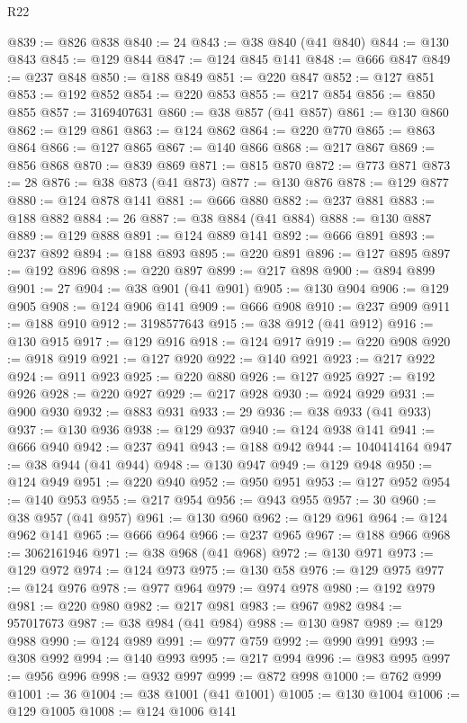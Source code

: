 \begin{lexlean}{R22}
\begin{coremodule}
@839 := @826 @838
@840 := 24
@843 := @38 @840 (@41 @840)
@844 := @130 @843
@845 := @129 @844
@847 := @124 @845 @141
@848 := @666 @847
@849 := @237 @848
@850 := @188 @849
@851 := @220 @847
@852 := @127 @851
@853 := @192 @852
@854 := @220 @853
@855 := @217 @854
@856 := @850 @855
@857 := 3169407631
@860 := @38 @857 (@41 @857)
@861 := @130 @860
@862 := @129 @861
@863 := @124 @862
@864 := @220 @770
@865 := @863 @864
@866 := @127 @865
@867 := @140 @866
@868 := @217 @867
@869 := @856 @868
@870 := @839 @869
@871 := @815 @870
@872 := @773 @871
@873 := 28
@876 := @38 @873 (@41 @873)
@877 := @130 @876
@878 := @129 @877
@880 := @124 @878 @141
@881 := @666 @880
@882 := @237 @881
@883 := @188 @882
@884 := 26
@887 := @38 @884 (@41 @884)
@888 := @130 @887
@889 := @129 @888
@891 := @124 @889 @141
@892 := @666 @891
@893 := @237 @892
@894 := @188 @893
@895 := @220 @891
@896 := @127 @895
@897 := @192 @896
@898 := @220 @897
@899 := @217 @898
@900 := @894 @899
@901 := 27
@904 := @38 @901 (@41 @901)
@905 := @130 @904
@906 := @129 @905
@908 := @124 @906 @141
@909 := @666 @908
@910 := @237 @909
@911 := @188 @910
@912 := 3198577643
@915 := @38 @912 (@41 @912)
@916 := @130 @915
@917 := @129 @916
@918 := @124 @917
@919 := @220 @908
@920 := @918 @919
@921 := @127 @920
@922 := @140 @921
@923 := @217 @922
@924 := @911 @923
@925 := @220 @880
@926 := @127 @925
@927 := @192 @926
@928 := @220 @927
@929 := @217 @928
@930 := @924 @929
@931 := @900 @930
@932 := @883 @931
@933 := 29
@936 := @38 @933 (@41 @933)
@937 := @130 @936
@938 := @129 @937
@940 := @124 @938 @141
@941 := @666 @940
@942 := @237 @941
@943 := @188 @942
@944 := 1040414164
@947 := @38 @944 (@41 @944)
@948 := @130 @947
@949 := @129 @948
@950 := @124 @949
@951 := @220 @940
@952 := @950 @951
@953 := @127 @952
@954 := @140 @953
@955 := @217 @954
@956 := @943 @955
@957 := 30
@960 := @38 @957 (@41 @957)
@961 := @130 @960
@962 := @129 @961
@964 := @124 @962 @141
@965 := @666 @964
@966 := @237 @965
@967 := @188 @966
@968 := 3062161946
@971 := @38 @968 (@41 @968)
@972 := @130 @971
@973 := @129 @972
@974 := @124 @973
@975 := @130 @58
@976 := @129 @975
@977 := @124 @976
@978 := @977 @964
@979 := @974 @978
@980 := @192 @979
@981 := @220 @980
@982 := @217 @981
@983 := @967 @982
@984 := 957017673
@987 := @38 @984 (@41 @984)
@988 := @130 @987
@989 := @129 @988
@990 := @124 @989
@991 := @977 @759
@992 := @990 @991
@993 := @308 @992
@994 := @140 @993
@995 := @217 @994
@996 := @983 @995
@997 := @956 @996
@998 := @932 @997
@999 := @872 @998
@1000 := @762 @999
@1001 := 36
@1004 := @38 @1001 (@41 @1001)
@1005 := @130 @1004
@1006 := @129 @1005
@1008 := @124 @1006 @141

\end{coremodule}
\end{lexlean}
